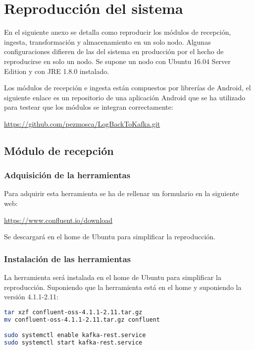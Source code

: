 \chapter{Reproducción del sistema}

En el siguiente anexo se detalla como reproducir los módulos de recepción, ingesta, transformación y almacenamiento en un solo nodo. Algunas configuraciones difieren de las del sistema en producción por el hecho de reproducirse en solo un nodo. Se supone un nodo con Ubuntu 16.04 Server Edition y con JRE 1.8.0 instalado.

Los módulos de recepción e ingesta están compuestos por librerías de Android, el siguiente enlace es un repositorio de una aplicación Android que se ha utilizado para testear que los módulos se integran correctamente:

\href{https://github.com/pezmosca/LogBackToKafka.git}{https://github.com/pezmosca/LogBackToKafka.git}

\section{Módulo de recepción}
\subsection{Adquisición de la herramientas}
Para adquirir esta herramienta se ha de rellenar un formulario en la siguiente web:

\href{https://www.confluent.io/download/}{https://www.confluent.io/download}

Se descargará en el home de Ubuntu para simplificar la reproducción.

\subsection{Instalación de las herramientas}
La herramienta será instalada en el home de Ubuntu para simplificar la reproducción. Suponiendo que la herramienta está en el home y suponiendo la versión 4.1.1-2.11:

\begin{lstlisting}[language=Bash]
tar xzf confluent-oss-4.1.1-2.11.tar.gz
mv confluent-oss-4.1.1-2.11.tar.gz confluent

sudo systemctl enable kafka-rest.service
sudo systemctl start kafka-rest.service
\end{lstlisting}

